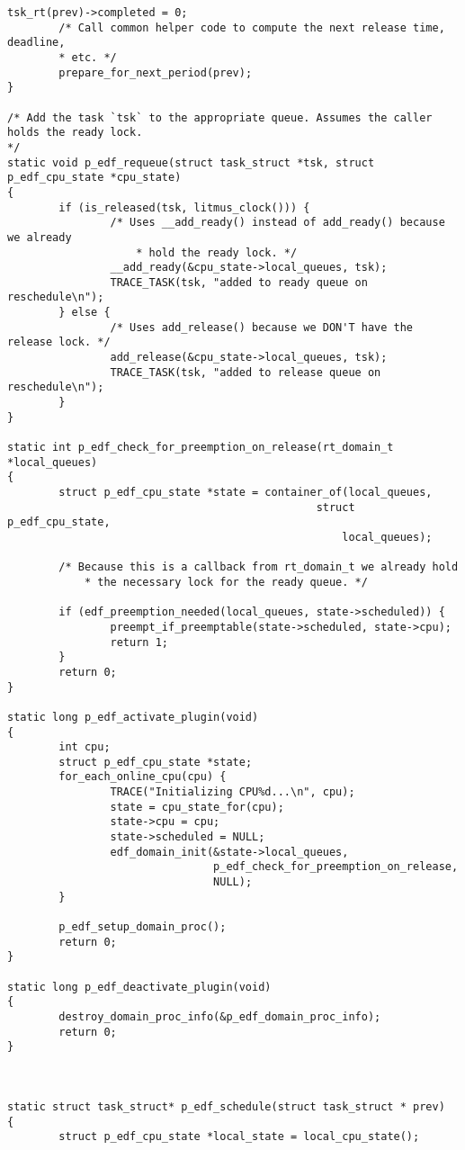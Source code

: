 \begin{lstlisting}[style=cstyle, caption=linux/litmus/sched\_p\_edf.c, label=annexe:p-edf]
    tsk_rt(prev)->completed = 0;
        /* Call common helper code to compute the next release time, deadline,
        * etc. */
        prepare_for_next_period(prev);
}

/* Add the task `tsk` to the appropriate queue. Assumes the caller holds the ready lock.
*/
static void p_edf_requeue(struct task_struct *tsk, struct p_edf_cpu_state *cpu_state)
{
        if (is_released(tsk, litmus_clock())) {
                /* Uses __add_ready() instead of add_ready() because we already
                    * hold the ready lock. */
                __add_ready(&cpu_state->local_queues, tsk);
                TRACE_TASK(tsk, "added to ready queue on reschedule\n");
        } else {
                /* Uses add_release() because we DON'T have the release lock. */
                add_release(&cpu_state->local_queues, tsk);
                TRACE_TASK(tsk, "added to release queue on reschedule\n");
        }
}

static int p_edf_check_for_preemption_on_release(rt_domain_t *local_queues)
{
        struct p_edf_cpu_state *state = container_of(local_queues, 
                                                struct p_edf_cpu_state,
                                                    local_queues);

        /* Because this is a callback from rt_domain_t we already hold
            * the necessary lock for the ready queue. */

        if (edf_preemption_needed(local_queues, state->scheduled)) {
                preempt_if_preemptable(state->scheduled, state->cpu);
                return 1;
        }
        return 0;
}

static long p_edf_activate_plugin(void)
{
        int cpu;
        struct p_edf_cpu_state *state;
        for_each_online_cpu(cpu) {
                TRACE("Initializing CPU%d...\n", cpu);
                state = cpu_state_for(cpu);
                state->cpu = cpu;
                state->scheduled = NULL;
                edf_domain_init(&state->local_queues,
                                p_edf_check_for_preemption_on_release,
                                NULL);
        }

        p_edf_setup_domain_proc();
        return 0;
}

static long p_edf_deactivate_plugin(void)
{
        destroy_domain_proc_info(&p_edf_domain_proc_info);
        return 0;
}



static struct task_struct* p_edf_schedule(struct task_struct * prev)
{
        struct p_edf_cpu_state *local_state = local_cpu_state();


\end{lstlisting}
